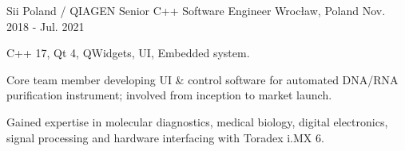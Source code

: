 \begin{cventries}
  \cventry
    {Sii Poland / QIAGEN} %
    {Senior C++ Software Engineer} %
    {Wrocław, Poland} %
    {Nov. 2018 - Jul. 2021} %
    {
        \begin{cvitems} %
            \item {C++ 17, Qt 4, QWidgets, UI, Embedded system.}
            \item {Core team member developing UI \& control software for automated DNA/RNA purification instrument; involved from inception to market launch.}
            \item {Gained expertise in molecular diagnostics, medical biology, digital electronics, signal processing and hardware interfacing with Toradex i.MX 6.}
        \end{cvitems}
    }


\end{cventries}
